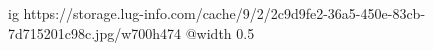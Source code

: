  
 
 
 
 

\ifcmt
  ig https://storage.lug-info.com/cache/9/2/2c9d9fe2-36a5-450e-83cb-7d715201c98c.jpg/w700h474%
  @width 0.5
\fi
